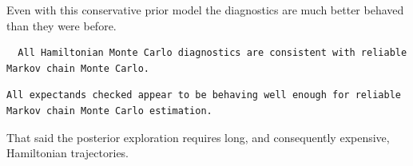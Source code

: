 \documentclass[
  letterpaper,
  DIV=11,
  numbers=noendperiod]{scrartcl}
\newenvironment{Shaded}{\begin{snugshade}}{\end{snugshade}}
\newcommand{\AttributeTok}[1]{\textcolor[rgb]{0.40,0.45,0.13}{#1}}
\newcommand{\ConstantTok}[1]{\textcolor[rgb]{0.56,0.35,0.01}{#1}}
\newcommand{\DecValTok}[1]{\textcolor[rgb]{0.68,0.00,0.00}{#1}}
\newcommand{\FunctionTok}[1]{\textcolor[rgb]{0.28,0.35,0.67}{#1}}
\newcommand{\NormalTok}[1]{\textcolor[rgb]{0.00,0.23,0.31}{#1}}
\newcommand{\OtherTok}[1]{\textcolor[rgb]{0.00,0.23,0.31}{#1}}
\newcommand{\SpecialCharTok}[1]{\textcolor[rgb]{0.37,0.37,0.37}{#1}}
\newcommand{\StringTok}[1]{\textcolor[rgb]{0.13,0.47,0.30}{#1}}
\begin{document}
Even with this conservative prior model the diagnostics are much better
behaved than they were before.

\begin{Shaded}
\end{Shaded}

\begin{verbatim}
  All Hamiltonian Monte Carlo diagnostics are consistent with reliable
Markov chain Monte Carlo.
\end{verbatim}

\begin{Shaded}
\end{Shaded}

\begin{verbatim}
All expectands checked appear to be behaving well enough for reliable
Markov chain Monte Carlo estimation.
\end{verbatim}

That said the posterior exploration requires long, and consequently
expensive, Hamiltonian trajectories.

\begin{Shaded}
\end{Shaded}
\end{document}
